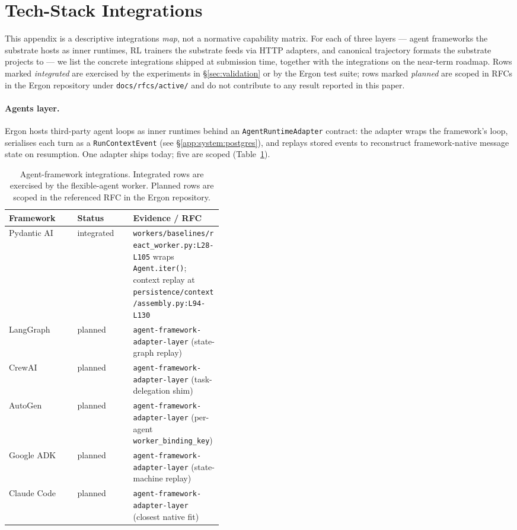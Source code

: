 \documentclass{article}
\begin{document}
\section{Tech-Stack Integrations}
\label{app:integrations}

This appendix is a descriptive integrations \emph{map}, not a
normative capability matrix. For each of three layers --- agent
frameworks the substrate hosts as inner runtimes, RL trainers
the substrate feeds via HTTP adapters, and canonical trajectory
formats the substrate projects to --- we list the concrete
integrations shipped at submission time, together with the
integrations on the near-term roadmap. Rows marked
\emph{integrated} are exercised by the experiments in
\S\ref{sec:validation} or by the Ergon test suite; rows marked
\emph{planned} are scoped in RFCs in the Ergon repository under
\texttt{docs/rfcs/active/} and do not contribute to any result
reported in this paper.

\paragraph{Agents layer.} Ergon hosts third-party agent loops
as inner runtimes behind an \texttt{AgentRuntimeAdapter}
contract: the adapter wraps the framework's loop, serialises
each turn as a \texttt{RunContextEvent} (see
\S\ref{app:system:postgres}), and replays stored events to
reconstruct framework-native message state on resumption. One
adapter ships today; five are scoped
(Table~\ref{tab:integrations:agents}).

\begin{table}[h]
\centering
\small
\setlength{\tabcolsep}{4pt}
\caption{Agent-framework integrations. Integrated rows are
exercised by the flexible-agent worker. Planned rows are scoped
in the referenced RFC in the Ergon repository.}
\label{tab:integrations:agents}
\begin{tabular}{@{}l l >{\raggedright\arraybackslash}p{0.42\linewidth}@{}}
\toprule
\textbf{Framework} & \textbf{Status} & \textbf{Evidence / RFC} \\
\midrule
Pydantic AI  & integrated & \texttt{workers/baselines/}\allowbreak\texttt{react\_worker.py:L28-L105} wraps \texttt{Agent.iter()}; context replay at \texttt{persistence/context/}\allowbreak\texttt{assembly.py:L94-L130} \\
LangGraph    & planned    & \texttt{agent-framework-adapter-layer} (state-graph replay) \\
CrewAI       & planned    & \texttt{agent-framework-adapter-layer} (task-delegation shim) \\
AutoGen      & planned    & \texttt{agent-framework-adapter-layer} (per-agent \texttt{worker\_binding\_key}) \\
Google ADK   & planned    & \texttt{agent-framework-adapter-layer} (state-machine replay) \\
Claude Code  & planned    & \texttt{agent-framework-adapter-layer} (closest native fit) \\
\bottomrule
\end{tabular}
\end{table}
\end{document}
